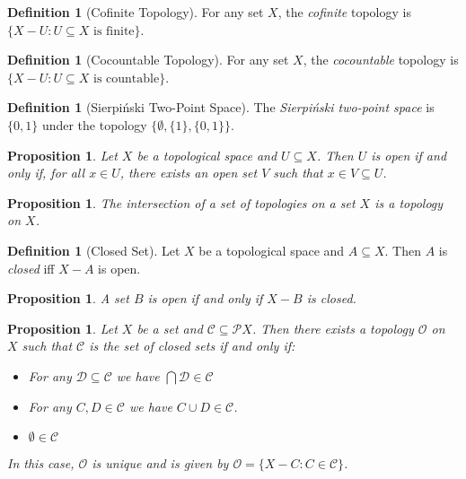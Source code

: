\documentclass{book}
\newtheorem{prop}[ax]{Proposition}
\theoremstyle{definition}
\newtheorem{df}[ax]{Definition}
\begin{document}
\begin{df}[Cofinite Topology]
For any set $X$, the \emph{cofinite} topology is $\{ X - U : U \subseteq X \text{ is finite} \}$.
\end{df}

\begin{df}[Cocountable Topology]
For any set $X$, the \emph{cocountable} topology is $\{ X - U : U \subseteq X \text{ is countable} \}$.
\end{df}

\begin{df}[Sierpi\'{n}ski Two-Point Space]
The \emph{Sierpi\'{n}ski two-point space} is $\{0,1\}$ under the topology $\{ \emptyset, \{1\}, \{0,1\} \}$.
\end{df}

\begin{prop}
Let $X$ be a topological space and $U \subseteq X$. Then $U$ is open if and only if, for all $x \in U$, there exists an open set $V$ such that $x \in V \subseteq U$.
\end{prop}

\begin{prop}
The intersection of a set of topologies on a set $X$ is a topology on $X$.
\end{prop}

\begin{df}[Closed Set]
Let $X$ be a topological space and $A \subseteq X$. Then $A$ is \emph{closed} iff $X - A$ is open.
\end{df}

\begin{prop}
A set $B$ is open if and only if $X - B$ is closed.
\end{prop}

\begin{prop}
Let $X$ be a set and $\mathcal{C} \subseteq \mathcal{P} X$. Then there exists a topology $\mathcal{O}$ on $X$ such that $\mathcal{C}$ is the set of closed sets if and only if:
\begin{itemize}
\item For any $\mathcal{D} \subseteq \mathcal{C}$ we have $\bigcap \mathcal{D} \in \mathcal{C}$
\item For any $C, D \in \mathcal{C}$ we have $C \cup D \in \mathcal{C}$.
\item $\emptyset \in \mathcal{C}$
\end{itemize}
In this case, $\mathcal{O}$ is unique and is given by $\mathcal{O} = \{ X - C : C \in \mathcal{C} \}$.
\end{prop}
\end{document}
